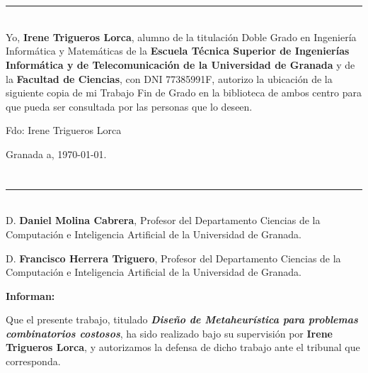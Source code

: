 \chapter*{}
\thispagestyle{empty}

\noindent\rule[-1ex]{\textwidth}{2pt}\\[4.5ex]

Yo, \textbf{Irene Trigueros Lorca}, alumno de la titulación Doble Grado en Ingeniería Informática y Matemáticas de la \textbf{Escuela Técnica Superior
de Ingenierías Informática y de Telecomunicación de la Universidad de Granada} y de la \textbf{Facultad de Ciencias}, con DNI 77385991F, autorizo la
ubicación de la siguiente copia de mi Trabajo Fin de Grado en la biblioteca de ambos centro para que pueda ser
consultada por las personas que lo deseen.

\vspace{6cm}

\noindent Fdo: Irene Trigueros Lorca

\vspace{2cm}

\begin{flushright}
Granada a, \today.
\end{flushright}


\chapter*{}
\thispagestyle{empty}

\noindent\rule[-1ex]{\textwidth}{2pt}\\[4.5ex]

D. \textbf{Daniel Molina Cabrera}, Profesor del Departamento Ciencias de la Computación e Inteligencia Artificial de la Universidad de Granada.

\vspace{0.5cm}

D. \textbf{Francisco Herrera Triguero}, Profesor del Departamento Ciencias de la Computación e Inteligencia Artificial de la Universidad de Granada.


\vspace{0.5cm}

\textbf{Informan:}

\vspace{0.5cm}

Que el presente trabajo, titulado \textit{\textbf{Diseño de Metaheurística para problemas combinatorios costosos}},
ha sido realizado bajo su supervisión por \textbf{Irene Trigueros Lorca}, y autorizamos la defensa de dicho trabajo ante el tribunal
que corresponda.

